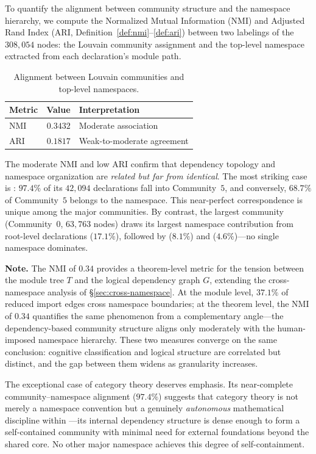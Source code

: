 To quantify the alignment between community structure and the namespace hierarchy, we compute the Normalized Mutual Information (NMI) and Adjusted Rand Index (ARI, Definition~\ref{def:nmi}--\ref{def:ari}) between two labelings of the $308{,}054$ nodes: the Louvain community assignment and the top-level namespace extracted from each declaration's module path.

\begin{table}[ht]
\centering
\caption{Alignment between Louvain communities and top-level namespaces.}
\label{tab:thm-nmi}
\begin{tabular}{lrl}
\toprule
Metric & Value & Interpretation \\
\midrule
NMI & $0.3432$ & Moderate association \\
ARI & $0.1817$ & Weak-to-moderate agreement \\
\bottomrule
\end{tabular}
\end{table}

The moderate NMI and low ARI confirm that dependency topology and namespace organization are \emph{related but far from identical}. The most striking case is : $97.4\%$ of its $42{,}094$ declarations fall into Community~$5$, and conversely, $68.7\%$ of Community~$5$ belongs to the  namespace. This near-perfect correspondence is unique among the major communities. By contrast, the largest community (Community~$0$, $63{,}763$ nodes) draws its largest namespace contribution from root-level declarations ($17.1\%$), followed by  ($8.1\%$) and  ($4.6\%$)---no single namespace dominates.

\noindent\textbf{Note.}
\label{rem:nmi-tension}
The NMI of $0.34$ provides a theorem-level metric for the tension between the module tree $T$ and the logical dependency graph $G$, extending the cross-namespace analysis of \S\ref{sec:cross-namespace}. At the module level, $37.1\%$ of reduced import edges cross namespace boundaries; at the theorem level, the NMI of $0.34$ quantifies the same phenomenon from a complementary angle---the dependency-based community structure aligns only moderately with the human-imposed namespace hierarchy. These two measures converge on the same conclusion: cognitive classification and logical structure are correlated but distinct, and the gap between them widens as granularity increases.

The exceptional case of category theory deserves emphasis. Its near-complete community--namespace alignment ($97.4\%$) suggests that category theory is not merely a namespace convention but a genuinely \emph{autonomous} mathematical discipline within ---its internal dependency structure is dense enough to form a self-contained community with minimal need for external foundations beyond the shared core. No other major namespace achieves this degree of self-containment.

